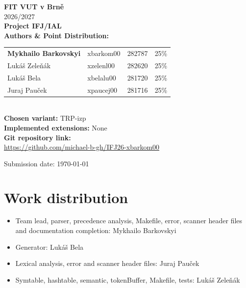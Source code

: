 \documentclass[12pt,a4paper]{article}
\begin{document}
\begin{titlepage}
    \begin{center}
        \vspace*{\fill}
        {\Large\bfseries FIT VUT v Brně}\\[3mm]
        {\large 2026/2027}\\[12mm]

        {\Huge\bfseries Project IFJ/IAL}\\[12mm]

        {\large\bfseries Authors \& Point Distribution:}\\[4mm]

        \bgroup
        \def\arraystretch{1.3}
        \begin{tabular}{l l l l}
            \textbf{Mykhailo Barkovskyi} & xbarkom00 & 282787 & 25\% \\
            Lukáš Zeleňák & xzelenl00 & 282620 & 25\% \\
            Lukáš Bela & xbelalu00 & 281720 & 25\% \\
            Juraj Pauček & xpaucej00 & 281716 & 25\% \\
        \end{tabular}
        \egroup
        \\[12mm]

        {\large\bfseries Chosen variant:} TRP-izp\\[6mm]

        {\large\bfseries Implemented extensions:} None\\[6mm]

        {\large\bfseries Git repository link:}\\[2mm]
        \url{https://github.com/michael-b-gh/IFJ26-xbarkom00}\\[2mm]
        \vfill

        {\large Submission date: \today}
    \end{center}
\end{titlepage}

\newpage
\tableofcontents
\newpage
\section{Work distribution}
\begin{itemize}
  \item Team lead, parser, precedence analysis, Makefile, error, scanner header files and documentation completion: Mykhailo Barkovskyi
  \item Generator: Lukáš Bela
  \item Lexical analysis, error and scanner header files: Juraj Pauček
  \item Symtable, hashtable, semantic, tokenBuffer, Makefile, tests: Lukáš Zeleňák
\end{itemize}
\end{document}
